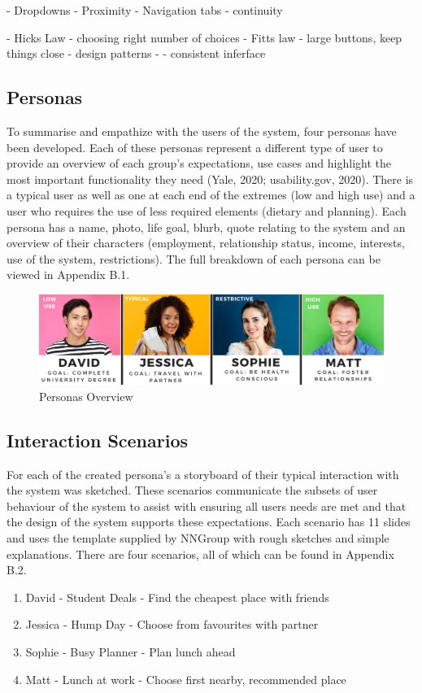\documentclass[a4 paper, 12pt]{article}
\begin{document}
        - Dropdowns - Proximity
        - Navigation tabs - continuity
        
        - Hicks Law - choosing right number of choices
        - Fitts law - large buttons, keep things close
        - design patterns - 
        - consistent inferface



\subsection{Personas}
To summarise and empathize with the users of the system, four personas have been developed. Each of these personas represent a different type of user to provide an overview of each group's expectations, use cases and highlight the most important functionality they need (Yale, 2020; usability.gov, 2020). There is a typical user as well as one at each end of the extremes (low and high use) and a user who requires the use of less required elements (dietary and planning). Each persona has a name, photo, life goal, blurb, quote relating to the system and an overview of their characters (employment, relationship status, income, interests, use of the system, restrictions). The full breakdown of each persona can be viewed in Appendix B.1.
    \begin{figure} [H]
        \centering
        \includegraphics[width=\textwidth, frame]
            {./images/personas_overview.PNG}
        \caption{Personas Overview}
    \end{figure}  


\subsection{Interaction Scenarios}
For each of the created persona's a storyboard of their typical interaction with the system was sketched. These scenarios communicate the subsets of user behaviour of the system to assist with ensuring all users needs are met and that the design of the system supports these expectations. Each scenario has 11 slides and uses the template supplied by NNGroup with rough sketches and simple explanations. There are four scenarios, all of which can be found in Appendix B.2.
    \begin{enumerate}
        \item David - Student Deals - Find the cheapest place with friends
        \item Jessica - Hump Day - Choose from favourites with partner
        \item Sophie - Busy Planner - Plan lunch ahead
        \item Matt - Lunch at work - Choose first nearby, recommended place
    \end{enumerate}
\end{document}
